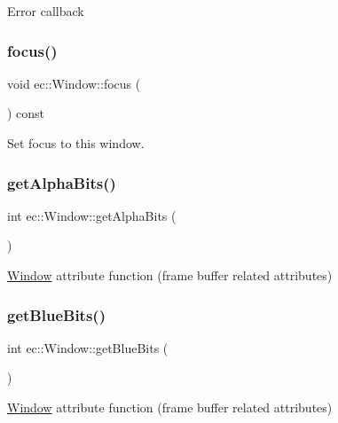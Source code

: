 Error callback \mbox{\label{classec_1_1_window_a927c041d6913c385efef327b091d5f4f}} 
\subsubsection{\texorpdfstring{focus()}{focus()}}
{\footnotesize\ttfamily void ec\+::\+Window\+::focus (\begin{DoxyParamCaption}{ }\end{DoxyParamCaption}) const}

Set focus to this window. \mbox{\label{classec_1_1_window_ac5bbb3be571ab430ad662b8ca9f7528a}} 
\subsubsection{\texorpdfstring{get\+Alpha\+Bits()}{getAlphaBits()}}
{\footnotesize\ttfamily int ec\+::\+Window\+::get\+Alpha\+Bits (\begin{DoxyParamCaption}{ }\end{DoxyParamCaption})\hspace{0.3cm}{\ttfamily [static]}}

\mbox{\hyperlink{classec_1_1_window}{Window}} attribute function (frame buffer related attributes) \mbox{\label{classec_1_1_window_a28643ab7d940920d1d01052b9c2bd30f}} 
\subsubsection{\texorpdfstring{get\+Blue\+Bits()}{getBlueBits()}}
{\footnotesize\ttfamily int ec\+::\+Window\+::get\+Blue\+Bits (\begin{DoxyParamCaption}{ }\end{DoxyParamCaption})\hspace{0.3cm}{\ttfamily [static]}}

\mbox{\hyperlink{classec_1_1_window}{Window}} attribute function (frame buffer related attributes) \mbox{\label{classec_1_1_window_a4355925b4898e5b032da048eec86f103}} 
